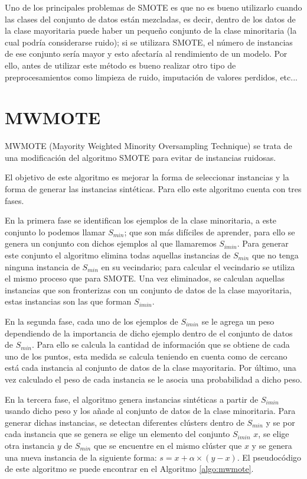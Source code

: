 Uno de los principales problemas de SMOTE es que no es bueno utilizarlo cuando las clases del conjunto de datos están mezcladas, es decir, dentro de los datos de la clase mayoritaria puede haber un pequeño conjunto de la clase minoritaria (la cual podría considerarse ruido); si se utilizara SMOTE, el número de instancias de ese conjunto sería mayor y esto afectaría al rendimiento de un modelo. Por ello, antes de utilizar este método es bueno realizar otro tipo de preprocesamientos como limpieza de ruido, imputación de valores perdidos, etc...
\newpage
\section{MWMOTE}
MWMOTE (Mayority Weighted Minority Oversampling Technique) \cite{barua2012mwmote} se trata de una modificación del algoritmo SMOTE para evitar de instancias ruidosas.\newline

El objetivo de este algoritmo es mejorar la forma de seleccionar instancias y la forma de generar las instancias sintéticas. Para ello este algoritmo cuenta con tres fases.\newline

En la primera fase se identifican los ejemplos de la clase minoritaria, a este conjunto lo podemos llamar $S_{min}$; que son más difíciles de aprender, para ello se genera un conjunto con dichos ejemplos al que llamaremos $S_{imin}$. Para generar este conjunto el algoritmo elimina todas aquellas instancias de $S_{min}$ que no tenga ninguna instancia de $S_{min}$ en su vecindario; para calcular el vecindario se utiliza el mismo proceso que para SMOTE. Una vez eliminados, se calculan aquellas instancias que son fronterizas con un conjunto de datos de la clase mayoritaria, estas instancias son las que forman $S_{imin}$.\newline

En la segunda fase, cada uno de los ejemplos de $S_{imin}$ se le agrega un peso dependiendo de la importancia de dicho ejemplo dentro de el conjunto de datos de $S_{min}$. Para ello se calcula la cantidad de información que se obtiene de cada uno de los puntos, esta medida se calcula teniendo en cuenta como de cercano está cada instancia al conjunto de datos de la clase mayoritaria. Por último, una vez calculado el peso de cada instancia se le asocia una probabilidad a dicho peso.\newline

En la tercera fase, el algoritmo genera instancias sintéticas a partir de $S_{imin}$ usando dicho peso y los añade al conjunto de datos de la clase minoritaria. Para generar dichas instancias, se detectan diferentes clústers dentro de $S_{min}$ y se por cada instancia que se genera se elige un elemento del conjunto $S_{imin}$ $x$, se elige otra instancia $y$ de $S_{min}$ que se encuentre en el mismo clúster que $x$ y se genera una nueva instancia de la siguiente forma: $ s = x + \alpha \times (y-x)$. El pseudocódigo de este algoritmo se puede encontrar en el Algoritmo \ref{algo:mwmote}.

